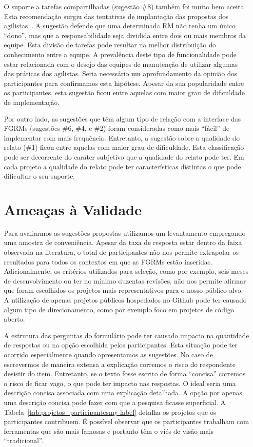 O suporte a tarefas compartilhadas (sugestão \#8) também foi muito bem aceita.
Esta recomendação surgiu das tentativas de implantação das propostas dos
agilistas~\cite{svensson2005introducing}. A sugestão defende que uma
determinada RM não tenha um único ``dono'', mas que a responsabilidade seja
dividida entre dois ou mais membros da equipe. Esta divisão de tarefas pode
resultar na melhor distribuição do conhecimento entre a equipe. A prevalência
deste tipo de funcionalidade pode estar relacionada com o desejo das equipes de
manutenção de utilizar algumas das práticas dos agilistas. Seria necessário um
aprofundamento da opinião dos participantes para confirmamos esta hipótese.
Apesar da sua popularidade entre os participantes, esta sugestão ficou entre
aquelas com maior grau de dificuldade de implementação.

Por outro lado, as sugestões que têm algum tipo de relação com a interface das
FGRMs (sugestões \#6, \#4, e \#2) foram consideradas como mais ``fácil'' de
implementar com mais frequência. Entretanto, a sugestão sobre a qualidade do
relato (\#1) ficou entre aquelas com maior grau de dificuldade. Esta
classificação pode ser decorrente do caráter subjetivo que a qualidade do
relato pode ter. Em cada projeto a qualidade do relato pode ter características
distintas o que pode dificultar o seu suporte.

\section{Ameaças à Validade}
\label{sec:sug_melhoria_ameacas}

Para avaliarmos as sugestões propostas utilizamos um levantamento empregando
uma amostra de conveniência. Apesar da taxa de resposta estar dentro da faixa
observada na literatura, o total de participantes não nos permite extrapolar os
resultados para todos os contextos em que as FGRMs estão inseridas.
Adicionalmente, os critérios utilizados para seleção, como por exemplo, seis
meses de desenvolvimento ou ter no mínimo duzentas revisões, não nos permite
afirmar que foram escolhidos os projetos mais representativos para o nosso
público-alvo. A utilização de apenas projetos públicos hospedados no Github
pode ter causado algum tipo de direcionamento, como por exemplo foco em
projetos de código aberto.

A estrutura das perguntas do formulário pode ter causado impacto na quantidade
de respostas ou na opção escolhida pelos participantes. Esta situação pode ter
ocorrido especialmente quando apresentamos as sugestões. No caso de escrevermos
de maneira extensa a explicação corremos o risco do respondente desistir do
item. Entretanto, se o texto fosse escrito de forma ``concisa'' corremos o
risco de ficar vago, o que pode ter impacto nas respostas. O ideal seria uma
descrição concisa associada com uma explicação detalhada. A opção por apenas
uma descrição concisa pode fazer com que a pesquisa ficasse superficial. A
Tabela~\ref{tab:projetos_participantesmy-label} detalha os projetos que os
participantes contribuem. É possível observar que os participantes trabalham
com ferramentas que são mais famosas e portanto têm o viés de visão mais
``tradicional''.

